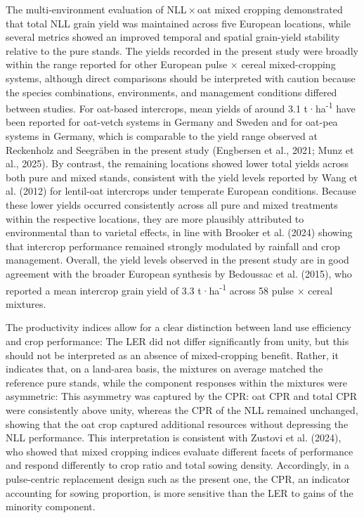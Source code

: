 \documentclass[
  british,
  a4paper,
  DIV=11,
  numbers=noendperiod]{scrreprt}
\begin{document}
The multi‑environment evaluation of NLL\,×\,oat mixed cropping
demonstrated that total NLL grain yield was maintained across five
European locations, while several metrics showed an improved temporal
and spatial grain-yield stability relative to the pure stands. The
yields recorded in the present study were broadly within the range
reported for other European pulse × cereal mixed-cropping systems,
although direct comparisons should be interpreted with caution because
the species combinations, environments, and management conditions
differed between studies. For oat-based intercrops, mean yields of
around 3.1 t·ha\textsuperscript{-1} have been reported for oat-vetch
systems in Germany and Sweden and for oat-pea systems in Germany, which
is comparable to the yield range observed at Reckenholz and Seegräben in
the present study (Engbersen et al., 2021; Munz et al., 2025). By
contrast, the remaining locations showed lower total yields across both
pure and mixed stands, consistent with the yield levels reported by Wang
et al. (2012) for lentil-oat intercrops under temperate European
conditions. Because these lower yields occurred consistently across all
pure and mixed treatments within the respective locations, they are more
plausibly attributed to environmental than to varietal effects, in line
with Brooker et al. (2024) showing that intercrop performance remained
strongly modulated by rainfall and crop management. Overall, the yield
levels observed in the present study are in good agreement with the
broader European synthesis by Bedoussac et al. (2015), who reported a
mean intercrop grain yield of 3.3 t·ha\textsuperscript{-1} across 58
pulse × cereal mixtures.

The productivity indices allow for a clear distinction between land use
efficiency and crop performance: The LER did not differ significantly
from unity, but this should not be interpreted as an absence of
mixed-cropping benefit. Rather, it indicates that, on a land-area basis,
the mixtures on average matched the reference pure stands, while the
component responses within the mixtures were asymmetric: This asymmetry
was captured by the CPR: oat CPR and total CPR were consistently above
unity, whereas the CPR of the NLL remained unchanged, showing that the
oat crop captured additional resources without depressing the NLL
performance. This interpretation is consistent with Zustovi et al.
(2024), who showed that mixed cropping indices evaluate different facets
of performance and respond differently to crop ratio and total sowing
density. Accordingly, in a pulse-centric replacement design such as the
present one, the CPR, an indicator accounting for sowing proportion, is
more sensitive than the LER to gains of the minority component.
\end{document}
